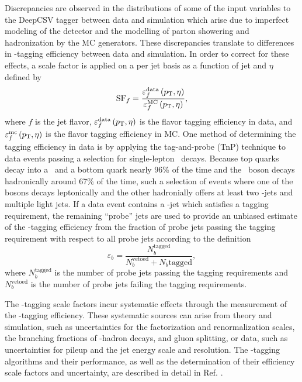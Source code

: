 Discrepancies are observed in the distributions of some of the input variables to the DeepCSV tagger between data and simulation which arise due to imperfect modeling of the detector and the modelling of parton showering and hadronization by the MC generators. These discrepancies translate to differences in \qrkb-tagging efficiency between data and simulation. In order to correct for these effects, a scale factor is applied on a per jet basis as a function of jet \pT and $\eta$ defined by
\begin{equation}
  \mathrm{SF}_{f} = \frac{\varepsilon_{f}^{\mathrm{data}} \left( \pT, \eta \right)}{\varepsilon_{f}^{\mathrm{MC}} \left( \pT, \eta \right)},
  \label{eq:btagsf}
\end{equation}
where $f$ is the jet flavor, $\varepsilon_{f}^{\mathrm{data}} \left( p_{\mathrm{T}}, \eta \right)$ is the flavor tagging efficiency in data, and $\varepsilon_{f}^{\mathrm{mc}} \left( p_{\mathrm{T}}, \eta \right)$ is the flavor tagging efficiency in MC. One method of determining the tagging efficiency in data is by applying the tag-and-probe (TnP) technique to data events passing a selection for single-lepton \qrkt\qrktbar\ decays. Because top quarks decay into a \bosW\ and a bottom quark nearly 96\% of the time and the \bosW\ boson decays hadronically around 67\% of the time, such a selection of events where one of the \bosW bosons decays leptonically and the other hadronially offers at least two \qrkb-jets and multiple light jets. If a data event contains a \qrkb-jet which satisfies a tagging requirement, the remaining ``probe'' jets are used to provide an unbiased estimate of the \qrkb-tagging efficiency from the fraction of probe jets passing the tagging requirement with respect to all probe jets according to the definition
\begin{equation}
  \varepsilon_{b} = \frac{N_{b}^{\mathrm{tagged}}}{N_{b}^{\mathrm{vetoed}} + N_{b}{\mathrm{tagged}}},
  \label{eq:btageff}
\end{equation}
where $N_{b}^{\mathrm{tagged}}$ is the number of probe jets passing the tagging requirements and $N_{b}^{\mathrm{vetoed}}$ is the number of probe jets failing the tagging requirements.

The \qrkb-tagging scale factors incur systematic effects through the measurement of the \qrkb-tagging efficiency. These systematic sources can arise from theory and simulation, such as uncertainties for the factorization and renormalization scales, the branching fractions of \qrkb-hadron decays, and gluon splitting, or data, such as uncertainties for pileup and the jet energy scale and resolution. The \qrkb-tagging algorithms and their performance, as well as the determination of their efficiency scale factors and uncertainty, are described in detail in Ref. \cite{CMSBTAG}.

